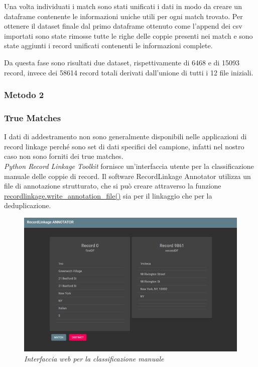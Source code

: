 \documentclass[a4paper,12pt]{article}
\begin{document}
\noindent Una volta individuati i match sono stati unificati i dati in modo da creare un dataframe contenente le informazioni uniche utili per ogni match trovato. Per ottenere il dataset finale dal primo dataframe ottenuto come l'append dei csv importati sono state rimosse tutte le righe delle coppie presenti nei match e sono state aggiunti i record unificati contenenti le informazioni complete.

\noindent Da questa fase sono risultati due dataset, rispettivamente di 6468 e di 15093 record, invece dei 58614 record totali derivati dall'unione di tutti i 12 file iniziali.

\subsubsection{Metodo 2}

\subsubsection{True Matches}
I dati di addestramento non sono generalmente disponibili nelle applicazioni di record linkage perché sono set di dati specifici del campione, infatti nel nostro caso non sono forniti dei true matches. \\

\noindent \textit{Python Record Linkage Toolkit}  fornisce un'interfaccia utente per la classificazione manuale delle coppie di record. Il software RecordLinkage Annotator utilizza un file di annotazione strutturato, che si può creare attraverso la funzione \href{https://recordlinkage.readthedocs.io/en/latest/annotation.html}{recordlinkage.write\_annotation\_file()} sia per il linkaggio che per la deduplicazione.\\
\begin{figure}[H]
	\centering
	\includegraphics[width=0.8\linewidth]{img/matchCenter.png}
	\caption{\textit{Interfaccia web per la classificazione manuale}}
\end{figure}
\end{document}
